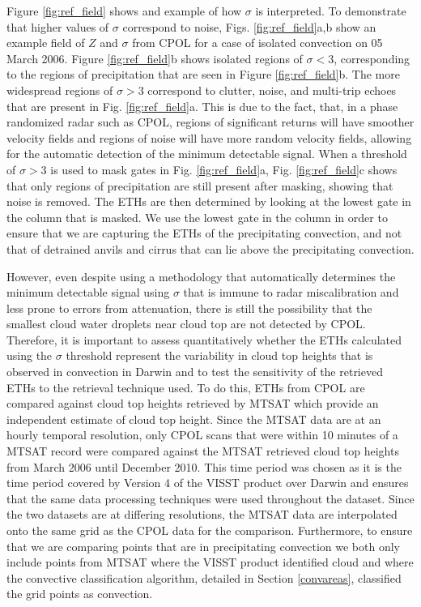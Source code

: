 \documentclass[journal abbreviation, manuscript]{copernicus}
\begin{document}
    Figure \ref{fig:ref_field} shows and example of how $\sigma$ is interpreted. To demonstrate that higher values of $\sigma$ correspond to noise, Figs. \ref{fig:ref_field}a,b show an example field of $Z$ and $\sigma$ from CPOL for a case of isolated convection on 05 March 2006. Figure \ref{fig:ref_field}b shows isolated regions of $\sigma < 3$, corresponding to the regions of precipitation that are seen in Figure \ref{fig:ref_field}b. The more widespread regions of $\sigma > 3$ correspond to clutter, noise, and multi-trip echoes that are present in Fig. \ref{fig:ref_field}a. This is due to the fact, that, in a phase randomized radar such as CPOL, regions of significant returns will have smoother velocity fields and regions of noise will have more random velocity fields, allowing for the automatic detection of the minimum detectable signal. When a threshold of $\sigma > 3$ is used to mask gates in Fig. \ref{fig:ref_field}a, Fig. \ref{fig:ref_field}c shows that only regions of precipitation are still present after masking, showing that noise is removed. The ETHs are then determined by looking at the lowest gate in the column that is masked. We use the lowest gate in the column in order to ensure that we are capturing the ETHs of the precipitating convection, and not that of detrained anvils and cirrus that can lie above the precipitating convection.
    
    However, even despite using a methodology that automatically determines the minimum detectable signal using $\sigma$ that is immune to radar miscalibration and less prone to errors from attenuation, there is still the possibility that the smallest cloud water droplets near cloud top are not detected by CPOL. Therefore, it is important to assess quantitatively whether the ETHs calculated using the $\sigma$ threshold represent the variability in cloud top heights that is observed in convection in Darwin and to test the sensitivity of the retrieved ETHs to the retrieval technique used. To do this, ETHs from CPOL are compared against cloud top heights retrieved by MTSAT which provide an independent estimate of cloud top height. Since the MTSAT data are at an hourly temporal resolution, only CPOL scans that were within 10 minutes of a MTSAT record were compared against the MTSAT retrieved cloud top heights from March 2006 until December 2010. This time period was chosen as it is the time period covered by Version 4 of the VISST product over Darwin and ensures that the same data processing techniques were used throughout the dataset. Since the two datasets are at differing resolutions, the MTSAT data are interpolated onto the same grid as the CPOL data for the comparison. Furthermore, to ensure that we are comparing points that are in precipitating convection we both only include points from MTSAT where the VISST product identified cloud and where the convective classification algorithm, detailed in Section \ref{convareas}, classified the grid points as convection. 
    
\end{document}
